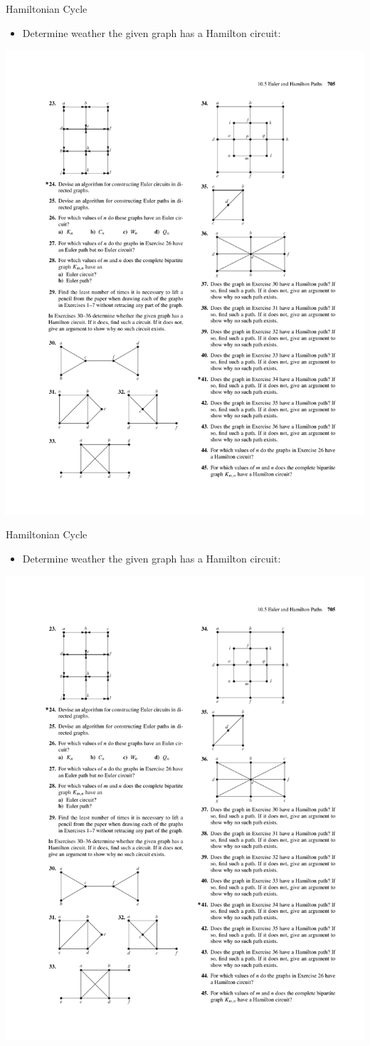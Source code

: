 \documentclass{beamer}
\theoremstyle{definition}
\begin{document}
\begin{frame}{Hamiltonian Cycle}
   \begin{itemize}
        \item Determine weather the given graph has a Hamilton circuit:
    \end{itemize}
    \centering \includegraphics[trim={3.1cm 2cm 14cm 23cm},clip,width=.65\linewidth]{p705}
\end{frame}

\begin{frame}{Hamiltonian Cycle}
   \begin{itemize}
        \item Determine weather the given graph has a Hamilton circuit:
    \end{itemize}
    \centering \includegraphics[trim={12.3cm 17.2cm 7cm 8cm},clip,width=.4\linewidth]{p705}
\end{frame}
\end{document}
